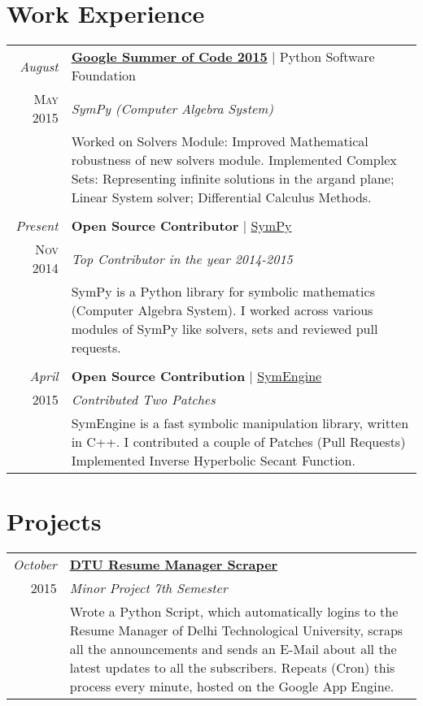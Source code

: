 \documentclass[a4paper,10pt]{article}
\begin{document}
\section{Work Experience}
\begin{tabular}{r|p{11cm}}
 
 \emph{August} & \textbf{\href{https://www.google-melange.com/gsoc/homepage/google/gsoc2015}{Google Summer of Code 2015}} | Python Software Foundation \\\textsc{May 2015}&\emph{SymPy (Computer Algebra System)}\\&\footnotesize{Worked on Solvers Module: Improved Mathematical robustness of new solvers module. Implemented Complex Sets: Representing infinite solutions in the argand plane; Linear System solver; Differential Calculus Methods.}\\\multicolumn{2}{c}{} \\
 
 \emph{Present} & \textbf{Open Source Contributor} | \href{http://www.sympy.org}{SymPy} \\\textsc{Nov 2014}&\emph{Top Contributor in the year 2014-2015}\\&\footnotesize{SymPy is a Python library for symbolic mathematics (Computer Algebra System). I worked across various modules of SymPy like solvers, sets and reviewed pull requests. }\\\multicolumn{2}{c}{} \\

 \emph{April} & \textbf{Open Source Contribution} |  \href{https://github.com/symengine/symengine/}{SymEngine} \\\textsc{2015}&\emph{Contributed Two Patches}\\&\footnotesize{SymEngine is a fast symbolic manipulation library, written in C++. I contributed a couple of Patches (Pull Requests) Implemented Inverse Hyperbolic Secant Function.}
\end{tabular}

\section{Projects}
\begin{tabular}{r|p{11cm}}

 \emph{October} & \textbf{\href{https://github.com/aktech/dturmscrap}{DTU Resume Manager Scraper}} \\\textsc{2015}&\emph{Minor Project 7th Semester}\\&\footnotesize{Wrote a Python Script, which automatically logins to the Resume Manager of Delhi Technological University, scraps all the announcements and sends an E-Mail about all the latest updates to all the subscribers. Repeats (Cron) this process every minute, hosted on the Google App Engine.}
\end{tabular}
\end{document}
